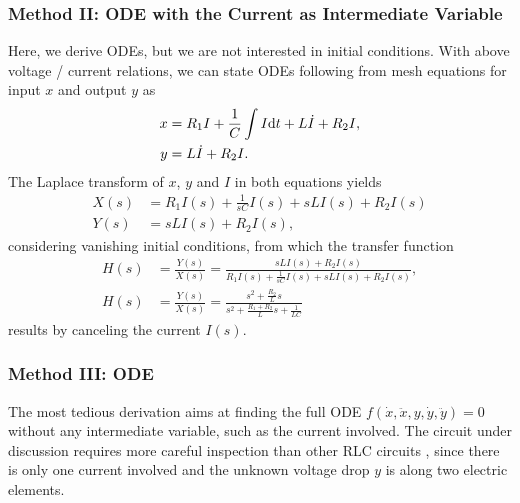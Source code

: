 \documentclass[11pt,a4paper,DIV=12]{scrartcl}
\newcommand\dx{\dot{x}}
\newcommand\ddx{\ddot{x}}
\newcommand\dy{\dot{y}}
\newcommand\ddy{\ddot{y}}
\renewcommand\c{I}
\newcommand\dc{\dot{I}}
\begin{document}
\subsubsection{Method II: ODE with the Current as Intermediate Variable}
%
Here, we derive ODEs, but we are not interested in initial conditions.
With above voltage / current relations, we can state ODEs following from mesh
equations for input $x$ and output $y$ as
%
\begin{align}
x& = R_1 \c + \frac{1}{C} \int \c \fsd t + L \dc + R_2 \c,\\
y& = L \dc + R_2 \c.
\end{align}
%
The Laplace transform of $x$, $y$ and $\c$ in both equations yields
%
\begin{align}
X(s)& = R_1 \c(s) + \frac{1}{s C} \c(s) + s L \c(s) + R_2 \c(s)\\
Y(s)& = s L \c(s) + R_2 \c(s),
\end{align}
%
considering vanishing initial conditions,
%
from which the transfer function
%
\begin{align}
H(s)& = \frac{Y(s)}{X(s)} = \frac{s L \c(s) + R_2 \c(s)}{R_1 \c(s) + \frac{1}{sC} \c(s) + s L \c(s) + R_2 \c(s)},\\
H(s)& = \frac{Y(s)}{X(s)} = \frac{s^2 + \frac{R_2}{L} s}{s^2 + \frac{R_1+R_2}{L} s + \frac{1}{L C}}
\end{align}
%
results by canceling the current $I(s)$.

\subsubsection{Method III: ODE}
%
The most tedious derivation aims at finding the full ODE $f(\dx,\ddx,y,\dy,\ddy)=0$
without any intermediate variable, such as the current involved.
%
The circuit under discussion requires more careful inspection than other RLC
circuits , since there is only one current involved and the unknown voltage drop
$y$ is along two electric elements.
\end{document}

